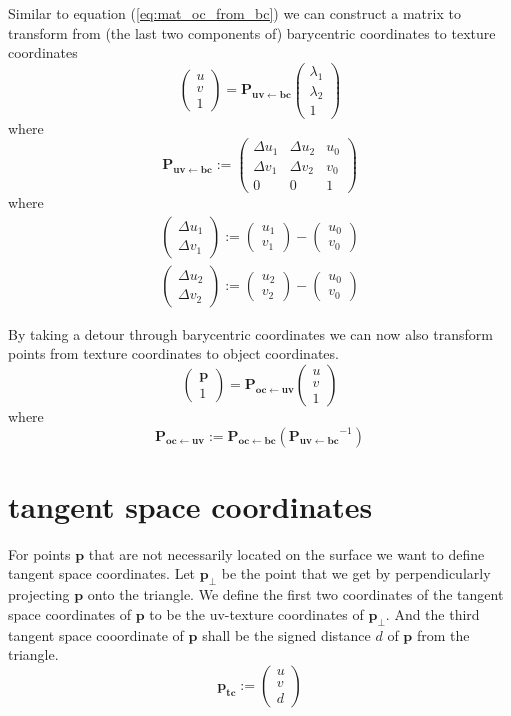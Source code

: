 \documentclass{article}
\newcommand{\point}[1]{\mathbf{#1}}
\newcommand{\mat}[1]{\mathbf{#1}}
\newcommand{\pMat}[2]{\mat{P_{#1 \leftarrow #2}}}
\newcommand{\colvec}[1]{\begin{pmatrix}#1\end{pmatrix}}
\begin{document}
Similar to equation (\ref{eq:mat_oc_from_bc}) we can construct a matrix to transform from (the last two components of) barycentric coordinates to texture coordinates
\[
 \colvec{u \\ v \\1} = \pMat{uv}{bc} \colvec{\lambda_1 \\ \lambda_2 \\ 1}
\]
where
\begin{equation}
 \pMat{uv}{bc} := \begin{pmatrix} 
                  \Delta u_1 & \Delta u_2 & u_0 \\
                  \Delta v_1 & \Delta v_2 & v_0 \\
                  0 & 0 & 1
                 \end{pmatrix}
\end{equation}
where
\begin{align*}
 \colvec{\Delta u_1 \\ \Delta v_1} := \colvec{u_1 \\ v_1} - \colvec{u_0 \\ v_0}\\
 \colvec{\Delta u_2 \\ \Delta v_2} := \colvec{u_2 \\ v_2} - \colvec{u_0 \\ v_0}
\end{align*}

By taking a detour through barycentric coordinates we can now also transform points from texture coordinates to object coordinates.
\begin{equation*}
\colvec{\point{p}\\1} = \pMat{oc}{uv} \colvec{u \\ v \\1} 
\end{equation*}
where
\begin{equation*}
 \pMat{oc}{uv} := \pMat{oc}{bc}(\pMat{uv}{bc}^{-1}) 
\end{equation*}

\section{tangent space coordinates}
For points \(\point{p}\) that are not necessarily located on the surface we want to define tangent space coordinates. Let \(\point{p_\perp}\) be the point that we get by perpendicularly projecting \(\point{p}\) onto the triangle. We define the first two coordinates of the tangent space coordinates of \(\point{p}\) to be the uv-texture coordinates of \(\point{p_\perp}\). And the third tangent space cooordinate of \(\point{p}\) shall be the signed distance \(d\) of \(\point{p}\) from the triangle.
\begin{equation*}
 \point{p_{tc}} := \colvec{u \\ v \\ d}
\end{equation*}
\end{document}
